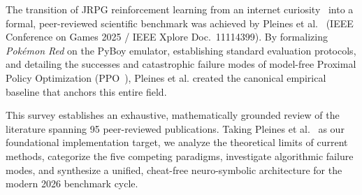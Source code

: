 \documentclass[journal,10pt,twocolumn]{IEEEtran}
\begin{document}
The transition of JRPG reinforcement learning from an internet curiosity~\cite{whidden2023pokemonred} into a formal, peer-reviewed scientific benchmark was achieved by Pleines et al.~\cite{pleines2025pokemon} (IEEE Conference on Games 2025 / IEEE Xplore Doc.~11114399). By formalizing \textit{Pok{\'e}mon Red} on the PyBoy emulator, establishing standard evaluation protocols, and detailing the successes and catastrophic failure modes of model-free Proximal Policy Optimization (PPO~\cite{schulman2017ppo}), Pleines et al. created the canonical empirical baseline that anchors this entire field. 

This survey establishes an exhaustive, mathematically grounded review of the literature spanning 95 peer-reviewed publications. Taking Pleines et al.~\cite{pleines2025pokemon} as our foundational implementation target, we analyze the theoretical limits of current methods, categorize the five competing paradigms, investigate algorithmic failure modes, and synthesize a unified, cheat-free neuro-symbolic architecture for the modern 2026 benchmark cycle.
\end{document}
